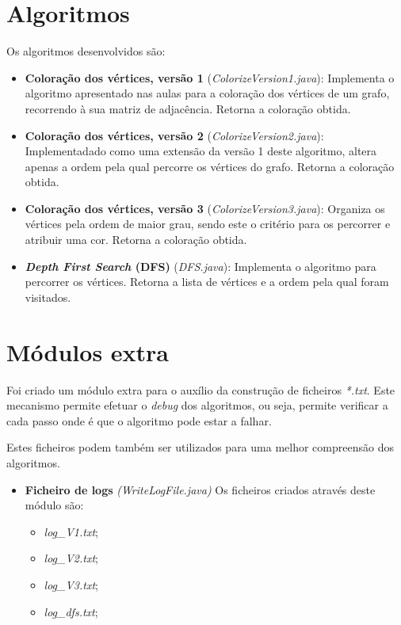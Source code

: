 \documentclass[a4paper,10pt]{report}
\begin{document}
\section{Algoritmos}
Os algoritmos desenvolvidos são:
\begin{itemize}
    \item \textbf{Coloração dos vértices, versão 1} (\textit{ColorizeVersion1.java}):
    Implementa o algoritmo apresentado nas aulas para a coloração dos vértices de um grafo, recorrendo à sua matriz de adjacência. Retorna a coloração obtida.
    \item \textbf{Coloração dos vértices, versão 2} (\textit{ColorizeVersion2.java}):
    Implementadado como uma extensão da versão 1 deste algoritmo, altera apenas a ordem pela qual percorre os vértices do grafo. Retorna a coloração obtida.
    \item \textbf{Coloração dos vértices, versão 3} (\textit{ColorizeVersion3.java}): Organiza os vértices pela ordem de maior grau, sendo este o critério para os percorrer e atribuir uma cor. Retorna a coloração obtida.
    \item \textbf{\textit{Depth First Search} (DFS)} (\textit{DFS.java}): Implementa o algoritmo para percorrer os vértices. Retorna a lista de vértices e a ordem pela qual foram visitados.
\end{itemize}

\section{Módulos extra}
Foi criado um módulo extra para o auxílio da construção de ficheiros \textit{*.txt}. Este mecanismo permite efetuar o \textit{debug} dos algoritmos, ou seja, permite verificar a cada passo onde é que o algoritmo pode estar a falhar.

Estes ficheiros podem também ser utilizados para uma melhor compreensão dos algoritmos.

\begin{itemize}
    \item \textbf{Ficheiro de logs} \textit{(WriteLogFile.java)} Os ficheiros criados através deste módulo são:
    \begin{itemize}
        \item\textit{log\_V1.txt};
        \item\textit{log\_V2.txt};
        \item\textit{log\_V3.txt};
        \item\textit{log\_dfs.txt};
    \end{itemize}
\end{itemize}
\end{document}
